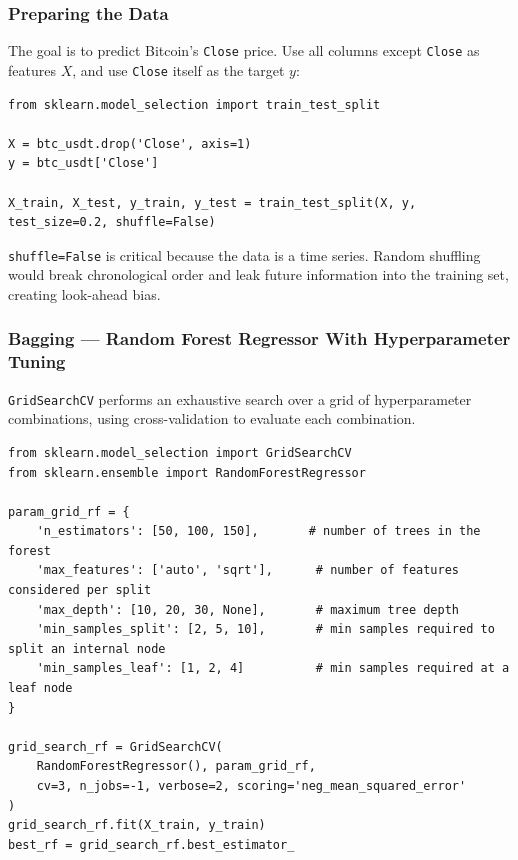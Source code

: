 \documentclass[12pt,openany]{book}
\begin{document}
\subsubsection{Preparing the Data}

The goal is to predict Bitcoin's \texttt{Close} price. Use all columns except \texttt{Close} as features \(X\), and use \texttt{Close} itself as the target \(y\):

\begin{Verbatim}[breaklines=true,breakanywhere=true,fontsize=\small]
from sklearn.model_selection import train_test_split

X = btc_usdt.drop('Close', axis=1)
y = btc_usdt['Close']

X_train, X_test, y_train, y_test = train_test_split(X, y, test_size=0.2, shuffle=False)
\end{Verbatim}

\texttt{shuffle=False} is critical because the data is a time series. Random shuffling would break chronological order and leak future information into the training set, creating look-ahead bias.

\subsubsection{Bagging --- Random Forest Regressor With Hyperparameter Tuning}

\texttt{GridSearchCV} performs an exhaustive search over a grid of hyperparameter combinations, using cross-validation to evaluate each combination.

\begin{Verbatim}[breaklines=true,breakanywhere=true,fontsize=\small]
from sklearn.model_selection import GridSearchCV
from sklearn.ensemble import RandomForestRegressor

param_grid_rf = {
    'n_estimators': [50, 100, 150],       # number of trees in the forest
    'max_features': ['auto', 'sqrt'],      # number of features considered per split
    'max_depth': [10, 20, 30, None],       # maximum tree depth
    'min_samples_split': [2, 5, 10],       # min samples required to split an internal node
    'min_samples_leaf': [1, 2, 4]          # min samples required at a leaf node
}

grid_search_rf = GridSearchCV(
    RandomForestRegressor(), param_grid_rf,
    cv=3, n_jobs=-1, verbose=2, scoring='neg_mean_squared_error'
)
grid_search_rf.fit(X_train, y_train)
best_rf = grid_search_rf.best_estimator_
\end{Verbatim}
\end{document}
